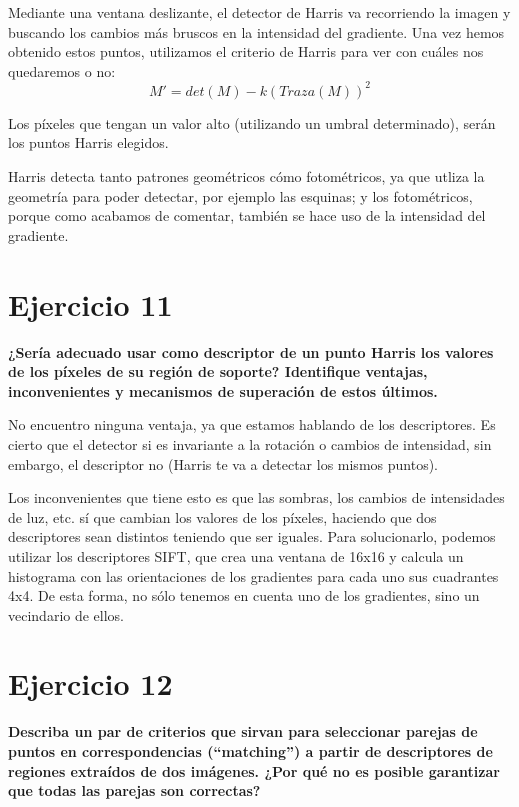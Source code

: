 \documentclass[11pt,a4paper]{article}
\begin{document}
Mediante una ventana deslizante, el detector de Harris va recorriendo la imagen y buscando los cambios más bruscos en la intensidad del gradiente. Una vez
hemos obtenido estos puntos, utilizamos el criterio de Harris para ver con cuáles nos quedaremos o no:
$$ M' = det(M) - k(Traza(M))^2 $$

Los píxeles que tengan un valor alto (utilizando un umbral determinado), serán los puntos Harris elegidos.

Harris detecta tanto patrones geométricos cómo fotométricos, ya que utliza la geometría para poder detectar, por ejemplo las esquinas; y los fotométricos,
porque como acabamos de comentar, también se hace uso de la intensidad del gradiente.


\section*{Ejercicio 11}
\textbf{¿Sería adecuado usar como descriptor de un punto Harris los valores de los píxeles de su región de soporte? Identifique ventajas, inconvenientes y
mecanismos de superación de estos últimos.}

No encuentro ninguna ventaja, ya que estamos hablando de los descriptores. Es cierto que el detector si es invariante a la rotación o cambios de intensidad,
sin embargo, el descriptor no (Harris te va a detectar los mismos puntos).

Los inconvenientes que tiene esto es que las sombras, los cambios de intensidades de luz, etc. sí que cambian los valores de los píxeles, haciendo que dos
descriptores sean distintos teniendo que ser iguales. Para solucionarlo, podemos utilizar los descriptores SIFT, que crea una ventana de 16x16 y calcula un
histograma con las orientaciones de los gradientes para cada uno sus cuadrantes 4x4. De esta forma, no sólo tenemos en cuenta uno de los gradientes, sino
un vecindario de ellos.


\section*{Ejercicio 12}
\textbf{Describa un par de criterios que sirvan para seleccionar parejas de puntos en correspondencias (“matching”) a partir de descriptores de regiones
extraídos de dos imágenes. ¿Por qué no es posible garantizar que todas las parejas son correctas?}
\end{document}
